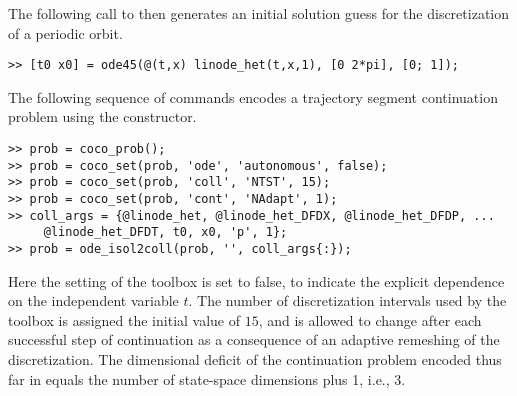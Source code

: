 The following call to  then generates an initial solution guess for the discretization of a periodic orbit.
\begin{lstlisting}[language=coco-highlight]
>> [t0 x0] = ode45(@(t,x) linode_het(t,x,1), [0 2*pi], [0; 1]);
\end{lstlisting}

The following sequence of commands encodes a trajectory segment continuation problem using the  constructor.
\begin{lstlisting}[language=coco-highlight]
>> prob = coco_prob();
>> prob = coco_set(prob, 'ode', 'autonomous', false);
>> prob = coco_set(prob, 'coll', 'NTST', 15);
>> prob = coco_set(prob, 'cont', 'NAdapt', 1);
>> coll_args = {@linode_het, @linode_het_DFDX, @linode_het_DFDP, ...
     @linode_het_DFDT, t0, x0, 'p', 1};
>> prob = ode_isol2coll(prob, '', coll_args{:});
\end{lstlisting}
Here the  setting of the  toolbox is set to false, to indicate the explicit dependence on the independent variable $t$. The number of discretization intervals used by the  toolbox is assigned the initial value of $15$, and is allowed to change after each successful step of continuation as a consequence of an adaptive remeshing of the discretization. The dimensional deficit of the continuation problem encoded thus far in  equals the number of state-space dimensions plus 1, i.e., 3.

